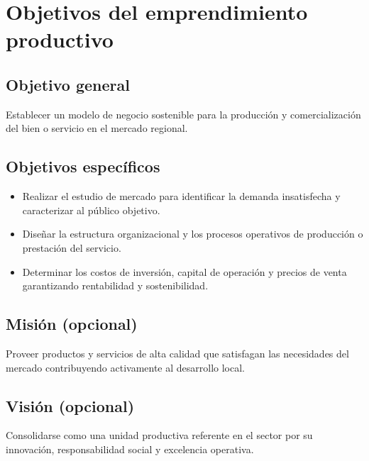 \section{Objetivos del emprendimiento productivo}
\label{sec:objetivos_emprendimiento}

\subsection{Objetivo general}
Establecer un modelo de negocio sostenible para la producción y comercialización del bien o servicio en el mercado regional.

\subsection{Objetivos específicos}
\begin{itemize}
    \item Realizar el estudio de mercado para identificar la demanda insatisfecha y caracterizar al público objetivo.
    \item Diseñar la estructura organizacional y los procesos operativos de producción o prestación del servicio.
    \item Determinar los costos de inversión, capital de operación y precios de venta garantizando rentabilidad y sostenibilidad.
\end{itemize}

\subsection{Misión (opcional)}
Proveer productos y servicios de alta calidad que satisfagan las necesidades del mercado contribuyendo activamente al desarrollo local.

\subsection{Visión (opcional)}
Consolidarse como una unidad productiva referente en el sector por su innovación, responsabilidad social y excelencia operativa.
